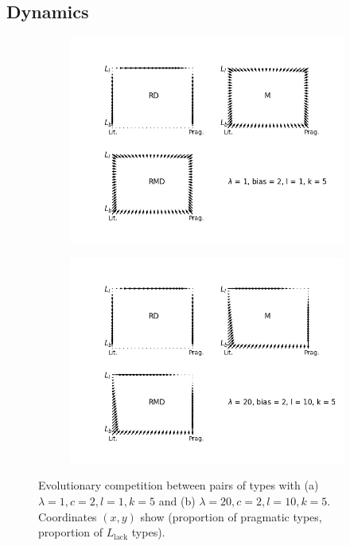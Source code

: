 \documentclass[fleqn,reqno,10pt]{article}
\newcommand{\mylang}[1]{\ensuremath{L_{\text{#1}}}\xspace} %
\newcommand{\Llack}{\mylang{lack}}
\begin{document}
\subsection*{Dynamics}
\begin{figure}
\centering
\begin{subfigure}{.6\textwidth}
  \centering
  \includegraphics[scale=0.45]{quiver-lam1-c2-k5-l1}
  \caption{}
  \label{fig:sub1}
\end{subfigure}%
\begin{subfigure}{.6\textwidth}
  \centering
  \includegraphics[scale=0.45]{quiver-lam20-c2-k5-l10}
  \caption{}
  \label{fig:sub2}
\end{subfigure}
\caption{Evolutionary competition between pairs of types with (a) $\lambda = 1, c = 2, l = 1, k = 5$ and (b) $\lambda = 20, c = 2, l =10, k =5$. Coordinates $(x,y)$ show (proportion of pragmatic types, proportion of $\Llack$ types).}
\label{fig:quiver}
\end{figure}
\end{document}
